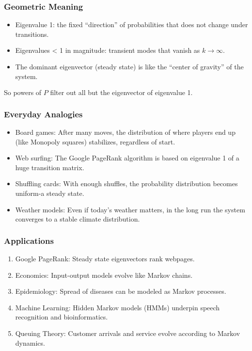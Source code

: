 \documentclass[
  letterpaper,
  DIV=11,
  numbers=noendperiod]{scrreprt}
\providecommand{\tightlist}{%
  \setlength{\itemsep}{0pt}\setlength{\parskip}{0pt}}
\begin{document}
\subsubsection{Geometric Meaning}\label{geometric-meaning-16}

\begin{itemize}
\tightlist
\item
  Eigenvalue 1: the fixed ``direction'' of probabilities that does not
  change under transitions.
\item
  Eigenvalues \textless{} 1 in magnitude: transient modes that vanish as
  \(k \to \infty\).
\item
  The dominant eigenvector (steady state) is like the ``center of
  gravity'' of the system.
\end{itemize}

So powers of \(P\) filter out all but the eigenvector of eigenvalue 1.

\subsubsection{Everyday Analogies}\label{everyday-analogies-65}

\begin{itemize}
\tightlist
\item
  Board games: After many moves, the distribution of where players end
  up (like Monopoly squares) stabilizes, regardless of start.
\item
  Web surfing: The Google PageRank algorithm is based on eigenvalue 1 of
  a huge transition matrix.
\item
  Shuffling cards: With enough shuffles, the probability distribution
  becomes uniform-a steady state.
\item
  Weather models: Even if today's weather matters, in the long run the
  system converges to a stable climate distribution.
\end{itemize}

\subsubsection{Applications}\label{applications-31}

\begin{enumerate}
\def\labelenumi{\arabic{enumi}.}
\tightlist
\item
  Google PageRank: Steady state eigenvectors rank webpages.
\item
  Economics: Input-output models evolve like Markov chains.
\item
  Epidemiology: Spread of diseases can be modeled as Markov processes.
\item
  Machine Learning: Hidden Markov models (HMMs) underpin speech
  recognition and bioinformatics.
\item
  Queuing Theory: Customer arrivals and service evolve according to
  Markov dynamics.
\end{enumerate}
\end{document}
